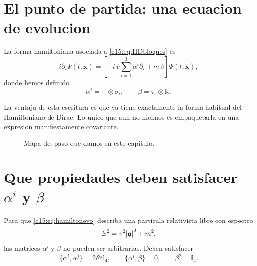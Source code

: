 \section{El punto de partida: una ecuacion de evolucion}
La forma hamiltoniana asociada a \eqref{c15:eq:HDbloques} es
\begin{equation}
i\partial_t \Psi(t,\bm{x}) = \left[-i\,v\sum_{i=1}^3 \alpha^i \partial_i + m\,\beta\right]\Psi(t,\bm{x}),
\label{c15:eq:hamiltonevo}
\end{equation}
donde hemos definido
\begin{equation}
\alpha^i = \tau_z\otimes \sigma_i,
\qquad
\beta = \tau_x\otimes \mathbb{I}_2.
\label{c15:eq:alphabeta}
\end{equation}

La ventaja de esta escritura es que ya tiene exactamente la forma habitual del Hamiltoniano de Dirac. Lo unico que aun no hicimos es empaquetarla en una expresion manifiestamente covariante.

\begin{figure}[h!]
\centering
{}
\caption{Mapa del paso que damos en este capitulo.}
\end{figure}

\section{\texorpdfstring{Que propiedades deben satisfacer \(\alpha^i\) y \(\beta\)}{Que propiedades deben satisfacer alpha^i y beta}}
Para que \eqref{c15:eq:hamiltonevo} describa una particula relativista libre con espectro
\begin{equation}
E^2 = v^2\abs{\bm{q}}^2 + m^2,
\end{equation}
las matrices $\alpha^i$ y $\beta$ no pueden ser arbitrarias. Deben satisfacer
\begin{equation}
\{\alpha^i,\alpha^j\}=2\delta^{ij}\mathbb{I}_4,
\qquad
\{\alpha^i,\beta\}=0,
\qquad
\beta^2=\mathbb{I}_4.
\label{c15:eq:diracalg}
\end{equation}

